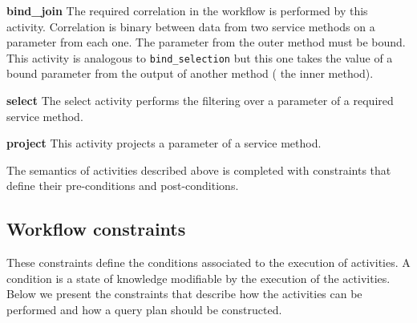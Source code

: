 

\textbf{bind_join} The required correlation in the workflow is performed by this activity. Correlation is binary between data from two service methods on a parameter from each one. The parameter from the outer method must be bound. This activity is analogous to \texttt{bind_selection} but this one takes the value of a bound parameter from the output of another method (\ie{} the inner method).
                     
%


                     
\textbf{select} The select activity performs the filtering over a parameter of a required service method.
            
%


                     
\textbf{project} This activity projects a parameter of a service method.
                     
%


				   
The semantics of activities described above is completed with constraints that define their pre-conditions and post-conditions.
				
\subsection{Workflow constraints} These constraints define the conditions associated to the execution of activities. A condition is a state of knowledge modifiable by the execution of the activities. Below we present the constraints that describe how the activities can be performed and how a query plan should be constructed.
               
